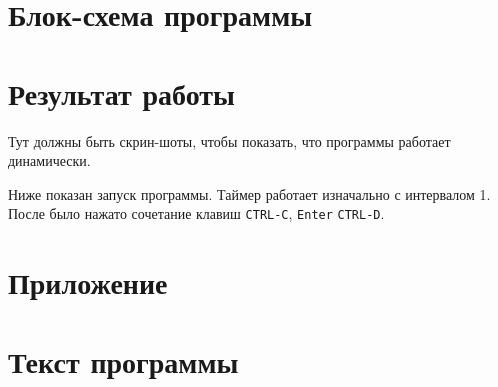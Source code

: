 \newpage

\section*{Блок-схема программы}


\newpage

\section*{Результат работы}

Тут должны быть скрин-шоты, чтобы показать, что программы работает
динамически.

Ниже показан запуск программы. Таймер работает изначально с интервалом 1.
После было нажато сочетание клавиш \texttt{CTRL-C}, \texttt{Enter}
\texttt{CTRL-D}.

\newpage

\appendix

\section*{Приложение}
\section*{Текст программы}

